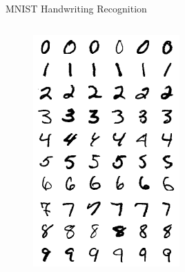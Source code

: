 \documentclass{beamer}
\begin{document}
\begin{frame}{MNIST Handwriting Recognition}
\begin{columns}
\begin{column}{0.3\textwidth}
\begin{figure}
			\includegraphics[width=\textwidth]{mnist}
		\end{figure}
	\end{column}
	\end{columns}
	\end{frame}
\end{document}
